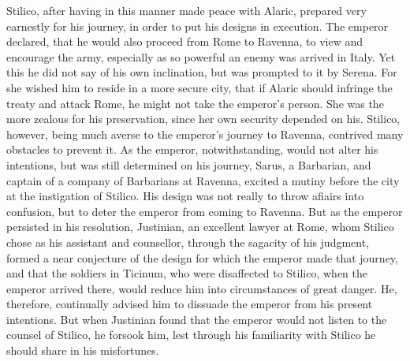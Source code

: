 Stilico, after having in this manner made peace with Alaric, prepared very earnestly for his journey, in order to put his designs in execution. The emperor declared, that he would also proceed from Rome to Ravenna, to view and encourage the army, especially as so powerful an enemy was arrived in Italy. Yet this he did not say of his own inclination, but was prompted to it by Serena. For she wished him to reside in a more secure city, that if Alaric should infringe the treaty and attack Rome, he might not take the emperor's person. She was the more zealous for his preservation, since her own security depended on his. Stilico, however, being much averse to the emperor's journey to Ravenna, contrived many obstacles to prevent it. As the emperor, notwithstanding, would not alter his intentions, but was still determined on his journey, Sarus, a Barbarian, and captain of a company of Barbarians at Ravenna, excited a mutiny before the city at the instigation of Stilico. His design was not really to throw afiairs into confusion, but to deter the
emperor from coming to Ravenna. But as the emperor persisted in his resolution, Justinian, an excellent lawyer at Rome, whom Stilico chose as his assistant and counsellor, through the sagacity
of his judgment, formed a near conjecture of the design for which the emperor made that journey, and that the soldiers in Ticinum, who were disaffected to Stilico, when the emperor arrived there, would reduce him into circumstances of great danger. He, therefore, continually advised him to dissuade the emperor from his present intentions. But when Justinian found that the emperor would not listen to the counsel of Stilico, he forsook him, lest through his familiarity with Stilico he should share in his misfortunes.

